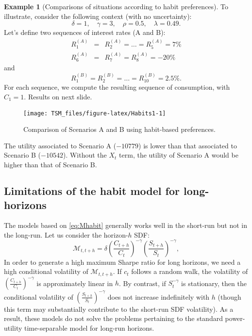 \documentclass[
  12pt,
]{book}
\theoremstyle{definition}
\theoremstyle{definition}
\newtheorem{example}{Example}[chapter]
\theoremstyle{definition}
\theoremstyle{definition}
\theoremstyle{remark}
\begin{document}
\begin{example}[Comparisons of situations according to habit preferences]
\protect\hypertarget{exm:habit}{}\label{exm:habit}To illustrate, consider the following context (with no uncertainty):
\[
\delta = 1,\quad \gamma = 3, \quad \rho = 0.5, \quad \lambda = 0.49.
\]
Let's define two sequences of interest rates (A and B):
\begin{eqnarray*}
R^{(A)}_1 &=&R^{(A)}_2 =\dots=R^{(A)}_5 =  7\% \\
R^{(A)}_6 &=&R^{(A)}_7 =R^{(A)}_8 =  -20\%
\end{eqnarray*}
and
\[
R^{(B)}_1 =R^{(B)}_2 =\dots=R^{(B)}_{10} =  2.5\%.
\]
For each sequence, we compute the resulting sequence of consumption, with \(C_1=1\).
Results on next slide.

\begin{figure}
\texttt{[image: TSM\_files/figure-latex/Habits1-1]} \caption{Comparison of Scenarios A and B using habit-based preferences.}\label{fig:Habits1}
\end{figure}

The utility associated to Scenario A (\(-10779\)) is lower than that associated to Scenario B (\(-10542\)).
Without the \(X_t\) term, the utility of Scenario A would be higher than that of Scenario B.
\end{example}

\hypertarget{limitations-of-the-habit-model-for-long-horizons}{%
\subsection{Limitations of the habit model for long-horizons}\label{limitations-of-the-habit-model-for-long-horizons}}

The models based on \eqref{eq:Mhabit} generally works well in the short-run but not in the long-run. Let us consider the horizon-\(h\) SDF:
\[
\mathcal{M}_{t,t+h} = \delta \left( \frac{C_{t+h}}{C_t} \right)^{-\gamma}\left( \frac{S_{t+h}}{S_t} \right)^{-\gamma},
\]
In order to generate a high maximum Sharpe ratio for long horizons, we need a high conditional volatility of \(\mathcal{M}_{t,t+h}\).
If \(c_t\) follows a random walk, the volatility of \(\left( \frac{C_{t+h}}{C_t} \right)^{-\gamma}\) is approximately linear in \(h\).
By contrast, if \(S_t^{-\gamma}\) is stationary, then the conditional volatility of \(\left( \frac{S_{t+h}}{S_t} \right)^{-\gamma}\) does not increase indefinitely with \(h\) (though this term may substantially contribute to the short-run SDF volatility). As a result, these models do not solve the problems pertaining to the standard power-utility time-separable model for long-run horizons.
\end{document}

